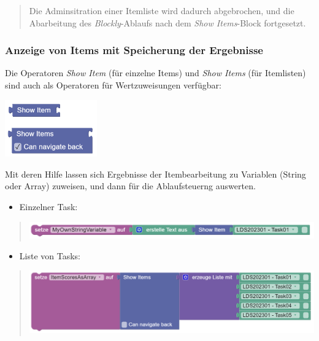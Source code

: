 \documentclass[
  letterpaper,
  DIV=11]{scrreprt}
\providecommand{\tightlist}{%
  \setlength{\itemsep}{0pt}\setlength{\parskip}{0pt}}\usepackage{longtable,booktabs,array}
\begin{document}
\begin{tcolorbox}
\begin{quote}
Die Adminsitration einer Itemliste wird dadurch abgebrochen, und die
Abarbeitung des \emph{Blockly}-Ablaufs nach dem \emph{Show Items}-Block
fortgesetzt.
\end{quote}

\hypertarget{anzeige-von-items-mit-speicherung-der-ergebnisse-1}{%
\subsubsection{Anzeige von Items mit Speicherung der
Ergebnisse}\label{anzeige-von-items-mit-speicherung-der-ergebnisse-1}}

Die Operatoren \emph{Show Item} (für einzelne Items) und \emph{Show
Items} (für Itemlisten) sind auch als Operatoren für Wertzuweisungen
verfügbar:

\includegraphics[width=1.5625in,height=\textheight]{img/screenshot-show-single-item-and-show-items-with-results-ENG.png}

Mit deren Hilfe lassen sich Ergebnisse der Itembearbeitung zu Variablen
(String oder Array) zuweisen, und dann für die Ablaufsteuerng auswerten.

\begin{itemize}
\tightlist
\item
  Einzelner Task:
\end{itemize}

\begin{quote}
\includegraphics[width=5.72917in,height=\textheight]{img/screenshot-show-single-item-lds2023-01-with-result-example-01-DEU.png}
\end{quote}

\begin{itemize}
\tightlist
\item
  Liste von Tasks:
\end{itemize}

\begin{quote}
\includegraphics[width=5.72917in,height=\textheight]{img/screenshot-show-items-list-lds2023-01-with-results-example-01-DEU.png}
\end{quote}


\end{tcolorbox}
\end{document}
